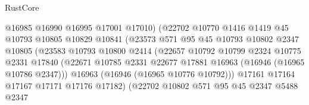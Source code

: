 \begin{lexlean}{RustCore}
\begin{coremodule}
                                    @16985
                                    @16990
                                    @16995
                                    @17001
                                    @17010)
                                  (@22702
                                    @10770
                                    @1416
                                    @1419
                                    @45
                                    @10793
                                    @10805
                                    @10829
                                    @10841
                                    (@23573
                                      @571
                                      @95
                                      @45
                                      @10793
                                      @10802
                                      @2347
                                      @10805
                                      (@23583
                                        @10793
                                        @10800
                                        @2414
                                        (@22657
                                          @10792
                                          @10799
                                          @2324
                                          @10775
                                          @2331
                                          @17840
                                          (@22671
                                            @10785
                                            @2331
                                            @22677
                                            @17881
                                            @16963
                                            (@16946 (@16965 @10786 @2347)))
                                          @16963
                                          (@16946 (@16965 @10776 @10792)))
                                        @17161
                                        @17164
                                        @17167
                                        @17171
                                        @17176
                                        @17182)
                                      (@22702
                                        @10802
                                        @571
                                        @95
                                        @45
                                        @2347
                                        @5488
                                        @2347

\end{coremodule}
\end{lexlean}
